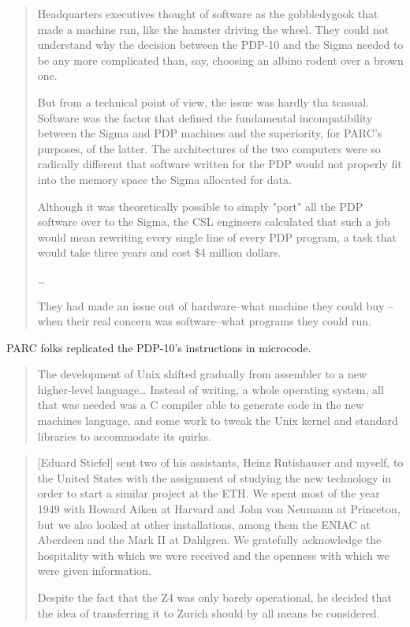 \begin{quotation}
    Headquarters executives thought of software as the gobbledygook that made a machine run,
    like the hamster driving the wheel. They could not understand why the decision between the PDP-10
    and the Sigma needed to be any more complicated than, say, choosing an albino rodent over a brown one.

    But from a technical point of view, the issue was hardly tha tcasual.
    Software was the factor that defined the fundamental incompatibility between the Sigma and PDP machines
    and the superiority, for PARC's purposes, of the latter.
    The architectures of the two computers were so radically different that software written for the PDP would not
    properly fit into the memory space the Sigma allocated for data.

    Although it was theoretically possible to simply "port" all the PDP software over to the Sigma, the CSL
    engineers calculated that such a job would mean rewriting every single line of every PDP program,
    a task that would take three years and cost \$4 million dollars.

    \dots

    They had made an issue out of hardware--what machine they could buy
    --when their real concern was software--what programs they could run.
\end{quotation}

PARC folks replicated the PDP-10's instructions in microcode.


\begin{quotation}
The development of Unix shifted gradually from assembler to a new higher-level language…
Instead of writing, a whole operating system, all that was needed was a C compiler able to
generate code in the new machines language, and some work to tweak the Unix kernel and
standard libraries to accommodate its quirks.
\end{quotation}

\begin{quotation}
    [Eduard Stiefel] sent two of his assistants, Heinz Rutishauser and myself,
to the United States with the assignment of studying the new technology in order to start a similar project at
the ETH. We spent most of the year 1949 with Howard Aiken at Harvard and John von Neumann at
Princeton, but we also looked at other installations, among them the ENIAC at Aberdeen and the Mark II at
Dahlgren. We gratefully acknowledge the hospitality with which we were received and the openness with
which we were given information.

Despite the fact that the Z4 was only barely operational, he decided that the idea of transferring it to Zurich
should by all means be considered.
\end{quotation}

